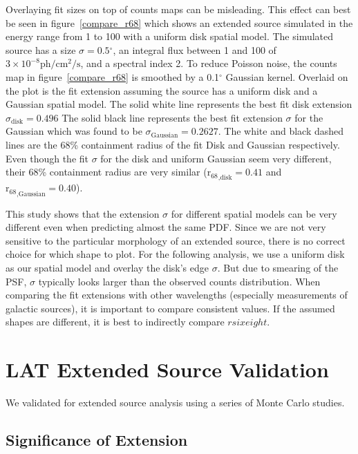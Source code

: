 \documentclass[12pt,preprint]{aastex}
\newcommand{\gev}{\text{GeV}\xspace}
\newcommand{\tev}{\text{TeV}\xspace}
\newcommand{\ph}{\text{ph}\xspace}
\newcommand{\cm}{\text{cm}\xspace}
\renewcommand{\sec}{\text{s}\xspace}
\newcommand{\rsixeight}{{\ensuremath{\text{r}_{68}}}\xspace}
\renewcommand{\deg}{\ensuremath{^\circ}\xspace}
\newcommand{\pointlike}{\text{\em pointlike}\xspace}
\begin{document}
Overlaying fit sizes on top of counts maps can be misleading.
This effect can best be seen in figure~\ref{compare_r68} which shows
an extended source simulated in the energy range from 1 \gev to 100
\gev with a uniform disk spatial model. The simulated source has a size
$\sigma=0.5\deg$, an integral flux between 1 \gev and 100 \gev of $3\times
10^{-8}\ph/\cm^2/\sec$, and a spectral index 2.  To reduce Poisson noise,
the counts map in figure~\ref{compare_r68} is smoothed by a 0.1\deg
Gaussian kernel. Overlaid on the plot is the fit extension assuming the
source has a uniform disk and a Gaussian spatial model.  The solid white
line represents the best fit disk extension $\sigma_\text{disk}=0.496$
The solid black line represents the best fit extension $\sigma$ for
the Gaussian which was found to be $\sigma_\text{Gaussian}=0.2627$.
The white and black dashed lines are the 68\% containment radius of
the fit Disk and Gaussian respectively.  Even though the fit $\sigma$
for the disk and uniform Gaussian seem very different, their 68\%
containment radius are very similar ($\rsixeight_\text{,disk}=0.41$
and $\rsixeight_\text{,Gaussian}=0.40$).

This study shows that the extension $\sigma$ for different spatial
models can be very different even when predicting almost the same PDF.
Since we are not very sensitive to the particular morphology of an
extended source, there is no correct choice for which shape to plot. For
the following analysis, we use a uniform disk as our spatial model
and overlay the disk's edge $\sigma$.  But due to smearing of the PSF,
$\sigma$ typically looks larger than the observed counts distribution.
When comparing the fit extensions with other wavelengths (especially \tev
measurements of galactic sources), it is important to compare consistent
values. If the assumed shapes are different, it is best to indirectly
compare $rsixeight$.


\section{LAT Extended Source Validation}

We validated \pointlike for extended source analysis using a series of
Monte Carlo studies.

\subsection{Significance of Extension}
\label{monte_carlo_validation}
\end{document}
